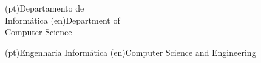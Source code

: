 




\ntdepartment(pt){Departamento de\\Informática}
\ntdepartment(en){Department of\\Computer Science}


\ntdegreename(pt){Engenharia Informática}
\ntdegreename(en){Computer Science and Engineering}

